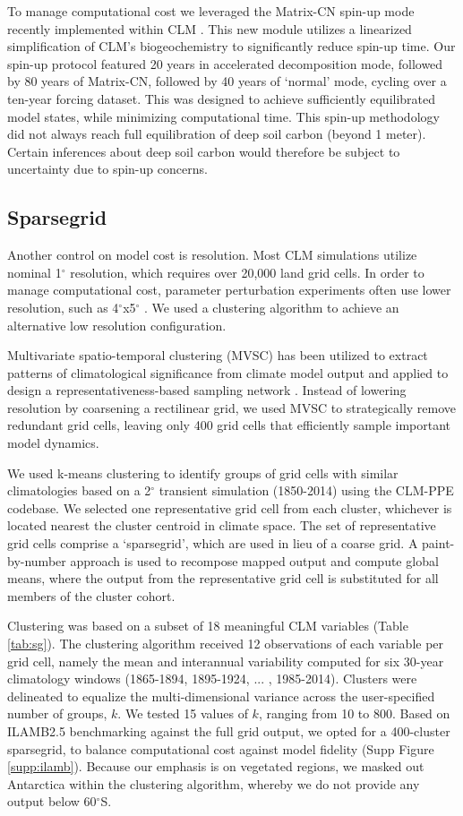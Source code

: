 \documentclass[draft]{agujournal2019}
\begin{document}
To manage computational cost we leveraged the Matrix-CN spin-up mode recently implemented within CLM \cite{lu2020}. This new module utilizes a linearized simplification of CLM's biogeochemistry to significantly reduce spin-up time. Our spin-up protocol featured 20 years in accelerated decomposition mode, followed by 80 years of Matrix-CN, followed by 40 years of `normal' mode, cycling over a ten-year forcing dataset. This was designed to achieve sufficiently equilibrated model states, while minimizing computational time. This spin-up methodology did not always reach full equilibration of deep soil carbon (beyond 1 meter). Certain inferences about deep soil carbon would therefore be subject to uncertainty due to spin-up concerns.

\subsection{Sparsegrid}
\label{sect:sg}
Another control on model cost is resolution. Most CLM simulations utilize nominal 1$^\circ$ resolution, which requires over 20,000 land grid cells. In order to manage computational cost, parameter perturbation experiments often use lower resolution, such as 4$^\circ$x5$^\circ$ \cite{dagon2020}. We used a clustering algorithm to achieve an alternative low resolution configuration.

Multivariate spatio-temporal clustering (MVSC) has been utilized to extract patterns of climatological significance from climate model output \cite{hoffman2005} and applied to design a representativeness-based sampling network \cite{hoffman2013}. Instead of lowering resolution by coarsening a rectilinear grid, we used MVSC to strategically remove redundant grid cells, leaving only 400 grid cells that efficiently sample important model dynamics.

We used k-means clustering to identify groups of grid cells with similar climatologies based on a 2$^\circ$ transient simulation (1850-2014) using the CLM-PPE codebase. We selected one representative grid cell from each cluster, whichever is located nearest the cluster centroid in climate space. The set of representative grid cells comprise a `sparsegrid', which are used in lieu of a coarse grid. A paint-by-number approach is used to recompose mapped output and compute global means, where the output from the representative grid cell is substituted for all members of the cluster cohort.

Clustering was based on a subset of 18 meaningful CLM variables (Table \ref{tab:sg}). The clustering algorithm received 12 observations of each variable per grid cell, namely the mean and interannual variability computed for six 30-year climatology windows (1865-1894, 1895-1924, ... , 1985-2014). Clusters were delineated to equalize the multi-dimensional variance across the user-specified number of groups, $k$. We tested 15 values of $k$, ranging from 10 to 800. Based on ILAMB2.5 benchmarking \cite{collier2018} against the full grid output, we opted for a 400-cluster sparsegrid, to balance computational cost against model fidelity (Supp Figure \ref{supp:ilamb}). Because our emphasis is on vegetated regions, we masked out Antarctica within the clustering algorithm, whereby we do not provide any output below 60$^\circ$S.
\end{document}
